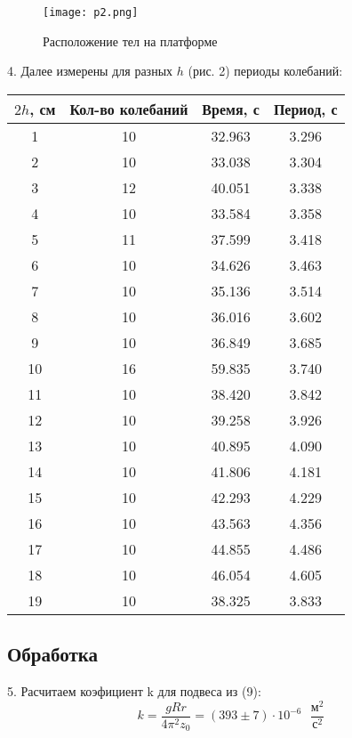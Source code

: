 \begin{figure}[H]
    \centering
\texttt{[image: p2.png]}
    \caption{Расположение тел на платформе}
    \label{fig:my_label}
\end{figure}

4. Далее измерены для разных $h$ (рис. 2) периоды колебаний:
\begin{center}
\begin{tabular}{|c|c|c|c|}
    \hline
    $2h$, см & Кол-во колебаний & Время, с & Период, с\\
    \hline
    1 & 10 & 32.963 & 3.296 \\
\hline
   2 & 10 & 33.038 & 3.304 \\
\hline
   3 & 12 & 40.051 & 3.338 \\
\hline
   4 & 10 & 33.584 & 3.358 \\
\hline
   5 & 11 & 37.599 & 3.418 \\
\hline
   6 & 10 & 34.626 & 3.463 \\
\hline
   7 & 10 & 35.136 & 3.514 \\
\hline
   8 & 10 & 36.016 & 3.602 \\
\hline
   9 & 10 & 36.849 & 3.685 \\
\hline
   10 & 16 & 59.835 & 3.740 \\
\hline
   11 & 10 & 38.420 & 3.842 \\
\hline
   12 & 10 & 39.258 & 3.926 \\
\hline
   13 & 10 & 40.895 & 4.090 \\
\hline
   14 & 10 & 41.806 & 4.181 \\
\hline
   15 & 10 & 42.293 & 4.229 \\
\hline
   16 & 10 & 43.563 & 4.356 \\
\hline
   17 & 10 & 44.855 & 4.486 \\
\hline
   18 & 10 & 46.054 & 4.605 \\
\hline
   19 & 10 & 38.325 & 3.833 \\
\hline

\end{tabular}
\end{center}

\subsection{Обработка}

5. Расчитаем коэфициент k для подвеса из (9):
\begin{equation*}
    k = \frac{gRr}{4\pi^2z_0} = \left(393 \pm 7\right) \cdot 10^{-6} \text{ } \frac{\text{м}^2}{\text{с}^2}
\end{equation*}

